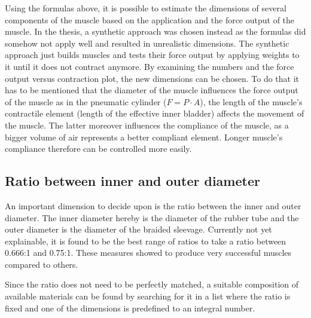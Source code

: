 \documentclass[main]{subfiles}
\begin{document}
Using the formulas above, it is possible to estimate the dimensions of several components of the muscle based on the application and the force output of the muscle. In the thesis, a synthetic approach was chosen instead as the formulas did somehow not apply well and resulted in unrealistic dimensions. The synthetic approach just builds muscles and tests their force output by applying weights to it until it does not contract anymore. By examining the numbers and the force output versus contraction plot, the new dimensions can be chosen. To do that it has to be mentioned that the diameter of the muscle influences the force output of the muscle as in the pneumatic cylinder ($F = P \cdot A$), the length of the muscle's contractile element (length of the effective inner bladder) affects the movement of the muscle. The latter moreover influences the compliance of the muscle, as a bigger volume of air represents a better compliant element. Longer muscle's compliance therefore can be controlled more easily.

\subsection{Ratio between inner and outer diameter}

An important dimension to decide upon is the ratio between the inner and outer diameter. The inner diameter hereby is the diameter of the rubber tube and the outer diameter is the diameter of the braided sleevage. Currently not yet explainable, it is found to be the best range of ratios to take a ratio between 0.666:1 and 0.75:1. These measures showed to produce very successful muscles compared to others.

Since the ratio does not need to be perfectly matched, a suitable composition of available materials can be found by searching for it in a list where the ratio is fixed and one of the dimensions is predefined to an integral number.\\
\end{document}
